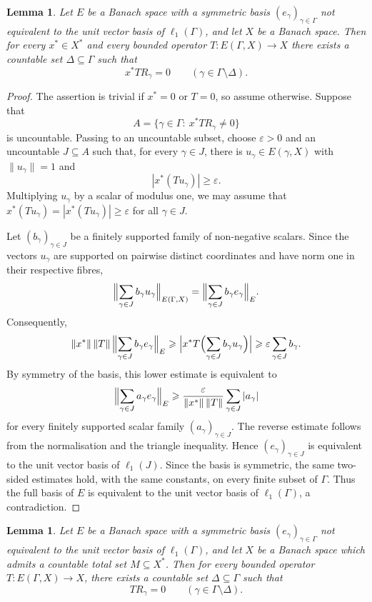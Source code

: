 \documentclass[11pt]{amsart}
\theoremstyle{plain}
\newtheorem{lemma}[theorem]{Lemma}
\theoremstyle{definition}
\numberwithin{equation}{section}
\newcommand{\norm}[1]{\lVert #1 \rVert}
\renewcommand{\ge}{\geqslant}
\begin{document}
\begin{lemma}\label{lmm: disjoint-1}
Let $E$ be a Banach space with a symmetric basis $(e_\gamma)_{\gamma \in \Gamma}$ not equivalent to the unit vector basis of $\ell_1(\Gamma)$, and let $X$ be a Banach space.  Then for every $x^*\in X^*$ and every bounded operator
$T\colon E(\Gamma,X)\to X$ there exists a countable set $\Delta\subseteq \Gamma$ such that
\[
    x^*TR_\gamma=0\qquad(\gamma\in\Gamma\setminus\Delta).
\]
\end{lemma}

\begin{proof}
The assertion is trivial if $x^*=0$ or $T=0$, so assume otherwise.  Suppose that
\[
    A=\{\gamma\in\Gamma:\ x^*TR_\gamma\neq0\}
\]
is uncountable.  Passing to an uncountable subset, choose $\varepsilon>0$ and an uncountable $J\subseteq A$ such that, for every $\gamma\in J$, there is $u_\gamma\in E(\gamma,X)$ with $\norm{u_\gamma}=1$ and
\[
    |x^*(Tu_\gamma)|\ge \varepsilon.
\]
Multiplying $u_\gamma$ by a scalar of modulus one, we may assume that $x^*(Tu_\gamma)=|x^*(Tu_\gamma)|\ge\varepsilon$ for all $\gamma\in J$.

Let $(b_\gamma)_{\gamma\in J}$ be a finitely supported family of non-negative scalars.  Since the vectors $u_\gamma$ are supported on pairwise distinct coordinates and have norm one in their respective fibres,
\[
    \Bigl\|\sum_{\gamma\in J} b_\gamma u_\gamma\Bigr\|_{E(\Gamma,X)}
    =\Bigl\|\sum_{\gamma\in J} b_\gamma e_\gamma\Bigr\|_E.
\]
Consequently,
\[
    \|x^*\|\,\|T\|\,\Bigl\|\sum_{\gamma\in J} b_\gamma e_\gamma\Bigr\|_E
    \ge
    \Bigl|x^*T\Bigl(\sum_{\gamma\in J}b_\gamma u_\gamma\Bigr)\Bigr|
    \ge \varepsilon\sum_{\gamma\in J}b_\gamma.
\]
By symmetry of the basis, this lower estimate is equivalent to
\[
    \Bigl\|\sum_{\gamma\in J} a_\gamma e_\gamma\Bigr\|_E
    \ge
    \frac{\varepsilon}{\|x^*\|\,\|T\|}
    \sum_{\gamma\in J}|a_\gamma|
\]
for every finitely supported scalar family $(a_\gamma)_{\gamma\in J}$.  The reverse estimate follows from the normalisation and the triangle inequality.  Hence $(e_\gamma)_{\gamma\in J}$ is equivalent to the unit vector basis of $\ell_1(J)$.  Since the basis is symmetric, the same two-sided estimates hold, with the same constants, on every finite subset of $\Gamma$.  Thus the full basis of $E$ is equivalent to the unit vector basis of $\ell_1(\Gamma)$, a contradiction.
\end{proof}

\begin{lemma}\label{lmm: disjoint-2}
Let $E$ be a Banach space with a symmetric basis $(e_\gamma)_{\gamma \in \Gamma}$ not equivalent to the unit vector basis of $\ell_1(\Gamma)$, and let $X$ be a Banach space which admits a countable total set $M \subseteq X^*$.  Then for every bounded operator $T \colon E(\Gamma, X) \to X$, there exists a countable set $\Delta \subseteq \Gamma$ such that
\[
    T R_{\gamma} = 0\qquad(\gamma \in \Gamma \setminus \Delta).
\]
\end{lemma}
\end{document}
